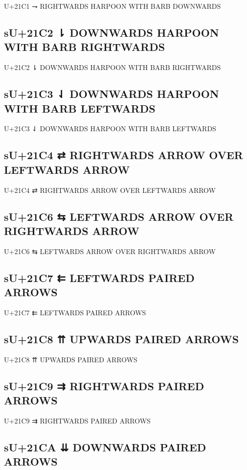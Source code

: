 U+21C1 ⇁ RIGHTWARDS HARPOON WITH BARB DOWNWARDS

\subsection{sU+21C2 ⇂ DOWNWARDS HARPOON WITH BARB RIGHTWARDS}

U+21C2 ⇂ DOWNWARDS HARPOON WITH BARB RIGHTWARDS

\subsection{sU+21C3 ⇃ DOWNWARDS HARPOON WITH BARB LEFTWARDS}

U+21C3 ⇃ DOWNWARDS HARPOON WITH BARB LEFTWARDS

\subsection{sU+21C4 ⇄ RIGHTWARDS ARROW OVER LEFTWARDS ARROW}

U+21C4 ⇄ RIGHTWARDS ARROW OVER LEFTWARDS ARROW

\subsection{sU+21C6 ⇆ LEFTWARDS ARROW OVER RIGHTWARDS ARROW}

U+21C6 ⇆ LEFTWARDS ARROW OVER RIGHTWARDS ARROW

\subsection{sU+21C7 ⇇ LEFTWARDS PAIRED ARROWS}

U+21C7 ⇇ LEFTWARDS PAIRED ARROWS

\subsection{sU+21C8 ⇈ UPWARDS PAIRED ARROWS}

U+21C8 ⇈ UPWARDS PAIRED ARROWS

\subsection{sU+21C9 ⇉ RIGHTWARDS PAIRED ARROWS}

U+21C9 ⇉ RIGHTWARDS PAIRED ARROWS

\subsection{sU+21CA ⇊ DOWNWARDS PAIRED ARROWS}

